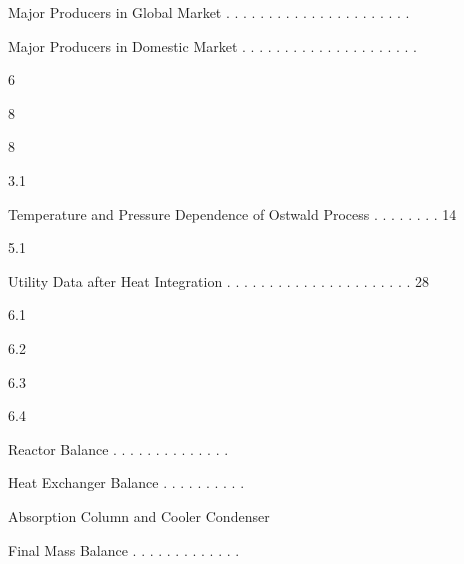 \documentclass[a4paper,portrait,12pt]{article}
\begin{document}
\begin{flushleft}
Major Producers in Global Market . . . . . . . . . . . . . . . . . . . . . .
\end{flushleft}


\begin{flushleft}
Major Producers in Domestic Market . . . . . . . . . . . . . . . . . . . . .
\end{flushleft}





6


8


8





3.1





\begin{flushleft}
Temperature and Pressure Dependence of Ostwald Process . . . . . . . . 14
\end{flushleft}





5.1





\begin{flushleft}
Utility Data after Heat Integration . . . . . . . . . . . . . . . . . . . . . . 28
\end{flushleft}





6.1


6.2


6.3


6.4





\begin{flushleft}
Reactor Balance . . . . . . . . . . . . . .
\end{flushleft}


\begin{flushleft}
Heat Exchanger Balance . . . . . . . . . .
\end{flushleft}


\begin{flushleft}
Absorption Column and Cooler Condenser
\end{flushleft}


\begin{flushleft}
Final Mass Balance . . . . . . . . . . . . .
\end{flushleft}
\end{document}
